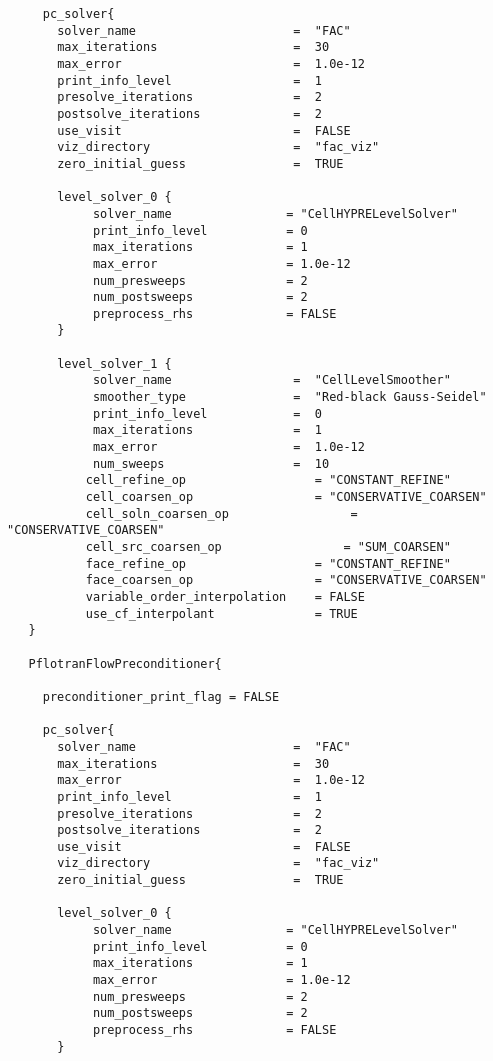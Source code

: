 \documentclass[12pt]{article}
\begin{document}
\begin{verbatim}
     pc_solver{
       solver_name                      =  "FAC"
       max_iterations                   =  30 
       max_error                        =  1.0e-12
       print_info_level                 =  1 
       presolve_iterations              =  2
       postsolve_iterations             =  2
       use_visit                        =  FALSE
       viz_directory                    =  "fac_viz"
       zero_initial_guess               =  TRUE

       level_solver_0 {
            solver_name                = "CellHYPRELevelSolver"
            print_info_level           = 0
            max_iterations             = 1
            max_error                  = 1.0e-12
            num_presweeps              = 2
            num_postsweeps             = 2
            preprocess_rhs             = FALSE
       }

       level_solver_1 {
            solver_name                 =  "CellLevelSmoother"
            smoother_type               =  "Red-black Gauss-Seidel"
            print_info_level            =  0
            max_iterations              =  1
            max_error                   =  1.0e-12
            num_sweeps                  =  10
	       cell_refine_op                  = "CONSTANT_REFINE"
	       cell_coarsen_op                 = "CONSERVATIVE_COARSEN"
	       cell_soln_coarsen_op                 = "CONSERVATIVE_COARSEN"
	       cell_src_coarsen_op                 = "SUM_COARSEN"
	       face_refine_op                  = "CONSTANT_REFINE"
	       face_coarsen_op                 = "CONSERVATIVE_COARSEN"
	       variable_order_interpolation    = FALSE
	       use_cf_interpolant              = TRUE
   }

   PflotranFlowPreconditioner{

     preconditioner_print_flag = FALSE

     pc_solver{
       solver_name                      =  "FAC"
       max_iterations                   =  30 
       max_error                        =  1.0e-12
       print_info_level                 =  1 
       presolve_iterations              =  2
       postsolve_iterations             =  2
       use_visit                        =  FALSE
       viz_directory                    =  "fac_viz"
       zero_initial_guess               =  TRUE

       level_solver_0 {
            solver_name                = "CellHYPRELevelSolver"
            print_info_level           = 0
            max_iterations             = 1
            max_error                  = 1.0e-12
            num_presweeps              = 2
            num_postsweeps             = 2
            preprocess_rhs             = FALSE
       }


\end{verbatim}
\end{document}
